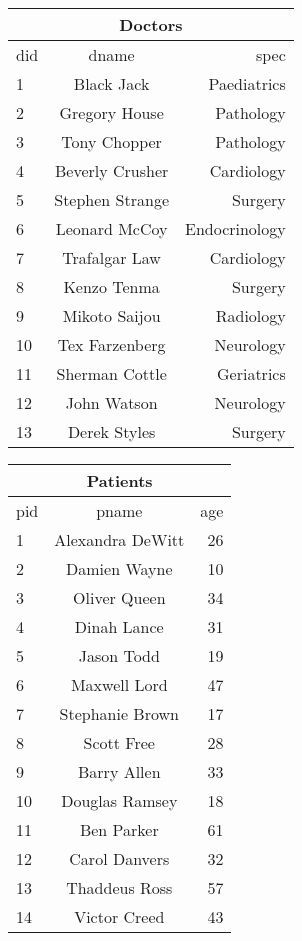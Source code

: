 \documentclass[a4paper,12pt,leqno]{article}
\begin{document}
\begin{center}
  \begin{tabular}{| l | c | r |}
  	\hline
	\multicolumn{3}{|c|}{Doctors} \\
    \hline
    did & dname & spec \\ \hline
    1 & Black Jack & Paediatrics \\
    2 & Gregory House & Pathology \\
    3 & Tony Chopper & Pathology \\
    4 & Beverly Crusher & Cardiology \\
    5 & Stephen Strange & Surgery \\
    6 & Leonard McCoy & Endocrinology \\
    7 & Trafalgar Law & Cardiology \\
    8 & Kenzo Tenma & Surgery \\
    9 & Mikoto Saijou & Radiology \\
    10 & Tex Farzenberg & Neurology \\ 
    11 & Sherman Cottle & Geriatrics \\ 
    12 & John Watson & Neurology \\ 
    13 & Derek Styles & Surgery \\ 
    \hline
  \end{tabular}
  \begin{tabular}{| l | c | r |}
  	\hline
	\multicolumn{3}{|c|}{Patients} \\
    \hline
    pid & pname & age \\ \hline
    1 & Alexandra DeWitt & 26 \\
    2 & Damien Wayne & 10 \\
    3 & Oliver Queen & 34 \\
    4 & Dinah Lance & 31 \\
    5 & Jason Todd & 19 \\
    6 & Maxwell Lord & 47 \\
    7 & Stephanie Brown & 17 \\
    8 & Scott Free & 28 \\
    9 & Barry Allen & 33 \\
    10 & Douglas Ramsey & 18 \\
    11 & Ben Parker & 61 \\
    12 & Carol Danvers & 32 \\
    13 & Thaddeus Ross & 57 \\
    14 & Victor Creed & 43 \\
    \hline
  \end{tabular}
\end{center}
\end{document}
